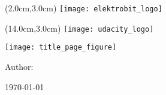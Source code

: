 % 
% 
%



\newlength{\tmpbaselineskip}
\setlength{\tmpbaselineskip}{\baselineskip}
\setlength{\baselineskip}{13.6pt}
\newlength{\tmpparindent}
\setlength{\tmpparindent}{\parindent}
\setlength{\parindent}{17pt}

\thispagestyle{udacitytitlepage}

\begin{textblock*}{20.0cm}(2.0cm,3.0cm) %
	\texttt{[image: elektrobit\_logo]}
\end{textblock*}

\begin{textblock*}{20.0cm}(14.0cm,3.0cm) %
	\texttt{[image: udacity\_logo]}
\end{textblock*}

\begin{center}

\vspace*{8.0cm}

\vspace{-0.2cm}

\vspace{-0.2cm}

\vspace{0.2cm}

\texttt{[image: title\_page\_figure]}

\end{center}

\begin{center}
\vspace{2.2cm}
{\Large{Author:}}
\vspace{0.2cm}

{\Large{\Author}}

\vspace{1.2cm}
{\normalsize{\today}}
\end{center}

\setlength{\baselineskip}{\tmpbaselineskip}
\setlength{\parindent}{\tmpparindent}

\restoregeometry
